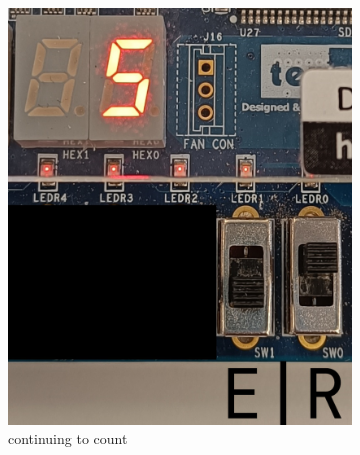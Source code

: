 \documentclass{article}
\begin{document}
\begin{figure}[h]
    \begin{subfigure}[t]{0.45\textwidth}
        \centering
        \includegraphics[width=1\textwidth]{Figures/Part3_3.jpg}
        \caption{continuing to count}
        \label{fig:p3_3}
    \end{subfigure}
    \hfill
    \begin{subfigure}[t]{0.45\textwidth}
        \centering

\end{subfigure}
\end{figure}
\end{document}
